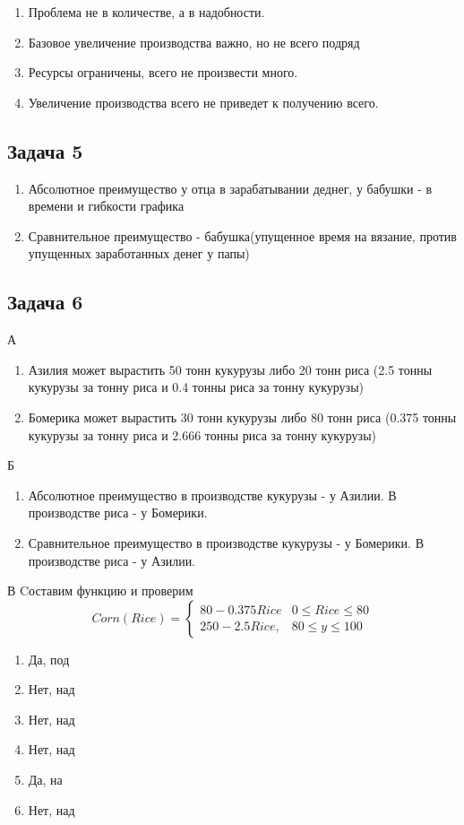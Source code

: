 \documentclass[a4paper,12pt]{article}
\begin{document}
\begin{enumerate}
    \item Проблема не в количестве, а в надобности.
    \item Базовое увеличение производства важно, но не всего подряд
    \item Ресурсы ограничены, всего не произвести много.
    \item Увеличение производства всего не приведет к получению всего.
\end{enumerate}

\subsection{Задача 5}
\begin{enumerate}
    \item Абсолютное преимущество у отца в зарабатывании деднег, у бабушки - в времени и гибкости графика
    \item Сравнительное преимущество - бабушка(упущенное время на вязание, против упущенных заработанных денег у папы)
\end{enumerate}

\subsection{Задача 6}
А
\begin{enumerate}
    \item Азилия может вырастить 50 тонн кукурузы либо 20 тонн риса (2.5 тонны кукурузы за тонну риса и 0.4 тонны риса за тонну кукурузы)
    \item Бомерика может вырастить 30 тонн кукурузы либо 80 тонн риса (0.375 тонны кукурузы за тонну риса и 2.666 тонны риса за тонну кукурузы)
\end{enumerate}
Б
\begin{enumerate}
    \item Абсолютное преимущество в производстве кукурузы - у Азилии. В производстве риса - у Бомерики.
    \item Сравнительное преимущество в производстве кукурузы - у Бомерики. В производстве риса - у Азилии.
\end{enumerate}
В
Cоставим функцию и проверим
\[
Corn(Rice) = 
\begin{cases}
    80 - 0.375Rice & 0 \le Rice \le 80 \\
    250 - 2.5Rice, & 80 \le y \le 100
\end{cases}
\]

\begin{enumerate}
    \item Да, под
    \item Нет, над
    \item Нет, над
    \item Нет, над
    \item Да, на
    \item Нет, над
\end{enumerate}
\end{document}
